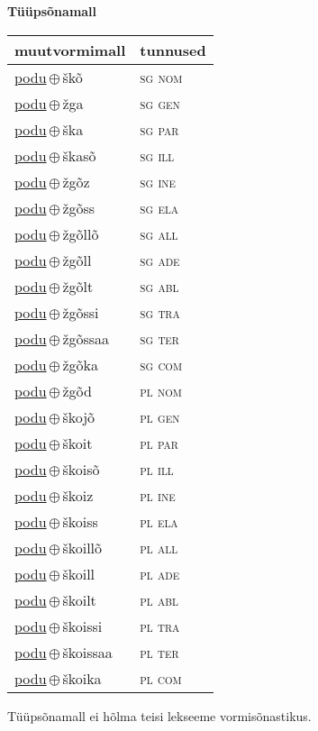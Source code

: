 

\vspace{3.5em}
\noindent \begin{minipage}{\textwidth}
\noindent \textbf{Tüüpsõnamall \,}\\

\begin{sideways}
\begin{tabular}{l l}
muutvormimall & tunnused \\
\hline
\underline{podu}\,$\oplus$\,škõ & \textsc{ sg nom } \\
\underline{podu}\,$\oplus$\,žga & \textsc{ sg gen } \\
\underline{podu}\,$\oplus$\,ška & \textsc{ sg par } \\
\underline{podu}\,$\oplus$\,škasõ & \textsc{ sg ill } \\
\underline{podu}\,$\oplus$\,žgõz & \textsc{ sg ine } \\
\underline{podu}\,$\oplus$\,žgõss & \textsc{ sg ela } \\
\underline{podu}\,$\oplus$\,žgõllõ & \textsc{ sg all } \\
\underline{podu}\,$\oplus$\,žgõll & \textsc{ sg ade } \\
\underline{podu}\,$\oplus$\,žgõlt & \textsc{ sg abl } \\
\underline{podu}\,$\oplus$\,žgõssi & \textsc{ sg tra } \\
\underline{podu}\,$\oplus$\,žgõssaa & \textsc{ sg ter } \\
\underline{podu}\,$\oplus$\,žgõka & \textsc{ sg com } \\
\underline{podu}\,$\oplus$\,žgõd & \textsc{ pl nom } \\
\underline{podu}\,$\oplus$\,škojõ & \textsc{ pl gen } \\
\underline{podu}\,$\oplus$\,škoit & \textsc{ pl par } \\
\underline{podu}\,$\oplus$\,škoisõ & \textsc{ pl ill } \\
\underline{podu}\,$\oplus$\,škoiz & \textsc{ pl ine } \\
\underline{podu}\,$\oplus$\,škoiss & \textsc{ pl ela } \\
\underline{podu}\,$\oplus$\,škoillõ & \textsc{ pl all } \\
\underline{podu}\,$\oplus$\,škoill & \textsc{ pl ade } \\
\underline{podu}\,$\oplus$\,škoilt & \textsc{ pl abl } \\
\underline{podu}\,$\oplus$\,škoissi & \textsc{ pl tra } \\
\underline{podu}\,$\oplus$\,škoissaa & \textsc{ pl ter } \\
\underline{podu}\,$\oplus$\,škoika & \textsc{ pl com } \\
\end{tabular}
\end{sideways}
\label{tab:tüüpsõnamall-poduškõ}

\end{minipage}

 
\vspace{1em}
\noindent Tüüpsõnamall  ei hõlma teisi lekseeme vormi\-sõnastikus.
